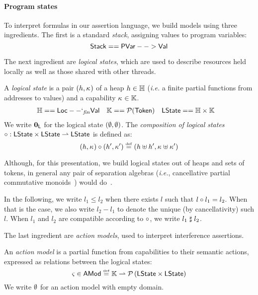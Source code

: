 \paragraph{Program states}
To interpret formulas in our assertion language, we build models using
three ingredients. The first is a standard \emph{stack}, assigning
values to program variables:
\[
\mathsf{Stack} == \mathsf{PVar} --> \mathsf{Val}
\]

The next ingredient are \emph{logical states}, which are used to
describe resources held locally as well as those shared with other
threads. 

\begin{definition}
  A \emph{logical state} is a pair $(h, \kappa_{})$ of a heap $h \in\mathbb{H}$ (\textit{i.e.} a finite partial functions from addresses
  to values) and a capability $\kappa_{} \in\mathbb{K}$.
  \begin{align*}
    \mathbb{H} &== \mathsf{Loc} --`_{\mathit{fin}} \mathsf{Val}&
    \mathbb{K} &== \mathcal{P}(\mathsf{Token})&
    \textsf{LState} &== \mathbb{H}\times \mathbb{K}
  \end{align*}
  We write $\mathbf{0}_{\textsf{L}}$ for the logical state $(\emptyset, \emptyset)$. The
  \emph{composition of logical states}
  $
  \circ : \textsf{LState} \times \textsf{LState} \rightharpoonup \textsf{LState}
  $
  is defined as:
  \[
  (h,\kappa_{}) \circ (h', \kappa_{}') \mathrel{\stackrel{\smash{\scriptscriptstyle{\mathrm{def}}}}{=}}
  (h\uplus h', \kappa_{}\uplus \kappa_{}')
  \]
\end{definition}
Although, for this presentation, we build logical states out of heaps
and sets of tokens, in general any pair of separation algebras
(\textit{i.e.}, cancellative partial commutative monoids~\cite{asl})
would do~\cite{colosl-tr14}.

In the following, we write $l_1\leq l_2$ when there exists $l$ such
that $l\circ l_1 = l_2$. When that is the case, we also write $l_2
- l_1$ to denote the unique (by cancellativity) such $l$. When $l_1$
and $l_2$ are compatible according to $\circ$, we write
$l_1\mathrel{\sharp} l_2$.

The last ingredient are \emph{action models}, used to interpret
interference assertions.

\begin{definition}
An \emph{action model} is a partial function from capabilities to
their semantic actions, expressed as relations between the logical
states:
\[
	\varsigma_{} \in \textsf{AMod} \mathrel{\stackrel{\smash{\scriptscriptstyle{\mathrm{def}}}}{=}} \mathbb{K} \rightharpoonup \mathcal{P}\left(\textsf{LState} \times \textsf{LState} \right)
\]
We write $\emptyset$ for an action model with empty domain.
\end{definition}


